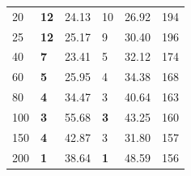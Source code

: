 \begin{table}[!ht]
\begin{minipage}{0.45\textwidth}
{\begin{tabular}{l|lr|lr|r}
			20 & \textbf{12} & 24.13 & {10}          & 26.92 &  194 \\
			
			25 & \textbf{12} & 25.17 & 9           & 30.40 &  196 \\
			
			40 & \textbf{7}  & 23.41 & 5           & 32.12 &  174 \\
			
			60 & \textbf{5}  & 25.95 & 4           & 34.38 &  168 \\
			
			80 & \textbf{4}  & 34.47 & 3           & 40.64 &  163 \\
			
			100 & \textbf{3}  & 55.68 & \textbf{3}  & 43.25 & 160 \\
			
			150 & \textbf{4}  & 42.87 &  {3}           & 31.80 & 157 \\
			
			200 & \textbf{1}  & 38.64 & \textbf{1}  & 48.59 & 156  \\	\hline
		\end{tabular}}
	\end{minipage}
	\vspace{-0.5cm}
\end{table}